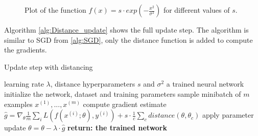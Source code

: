 \begin{figure}[h]%
    \centering
    \begin{center}
         
         \caption{Plot of the function $f(x)=s\cdot exp(-\frac{x^2}{\sigma^2})$ for different values of $s$.}
         \label{fig:Gaussian_strength}
    \end{center}
\end{figure}

Algorithm \ref{alg:Distance_update} shows the full update step. The algorithm is
similar to SGD from \ref{alg:SGD}, only the distance function is added to
compute the gradients.

\begin{algorithm}\label{alg:Distance_update}
    \begin{algorithmic}[1]
        \caption{Update step with distancing}
        \REQUIRE learning rate $\lambda$, distance hyperparameters $s$ and $\sigma^2$
        \ENSURE a trained neural network
        \STATE initialize the network, dataset and training parameters
            \STATE sample minibatch of $m$ examples ${x^{(1)}, ... ,x^{(m)}}$
            \STATE compute gradient estimate $\hat{g}=\nabla_\theta \frac{1}{m} \sum_i L(f(x^{(i)};\theta),y^{(i)})+ s \cdot \frac{1}{c}\sum_c distance(\theta , \theta_c)$
            \STATE apply parameter update $\theta=\theta-\lambda\cdot\hat{g}$
        \ENDWHILE
        \STATE \textbf{return: the trained network}
    \end{algorithmic}
\end{algorithm}

